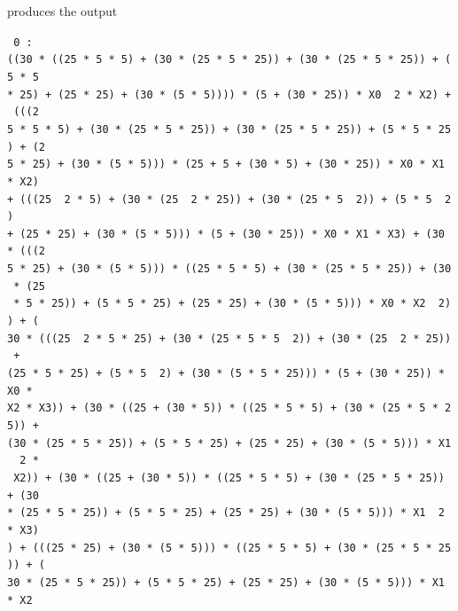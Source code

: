 
produces the output

{\tt
  0 : \\
((30\ *\ ((25\ *\ 5\ *\ 5)\ +\ (30\ *\ (25\ *\ 5\ *\ 25))\ +\ (30\ *\ (25\ *\ 5\ *\ 25))\ +\ (5\ *\ 5\ \\
*\ 25)\ +\ (25\ *\ 25)\ +\ (30\ *\ (5\ *\ 5))))\ *\ (5\ +\ (30\ *\ 25))\ *\ X0\ \ 2\ *\ X2)\ +\ (((2\\
5\ *\ 5\ *\ 5)\ +\ (30\ *\ (25\ *\ 5\ *\ 25))\ +\ (30\ *\ (25\ *\ 5\ *\ 25))\ +\ (5\ *\ 5\ *\ 25)\ +\ (2\\
5\ *\ 25)\ +\ (30\ *\ (5\ *\ 5)))\ *\ (25\ +\ 5\ +\ (30\ *\ 5)\ +\ (30\ *\ 25))\ *\ X0\ *\ X1\ *\ X2)\ \\
+\ (((25\ \ 2\ *\ 5)\ +\ (30\ *\ (25\ \ 2\ *\ 25))\ +\ (30\ *\ (25\ *\ 5\ \ 2))\ +\ (5\ *\ 5\ \ 2)\ \\
+\ (25\ *\ 25)\ +\ (30\ *\ (5\ *\ 5)))\ *\ (5\ +\ (30\ *\ 25))\ *\ X0\ *\ X1\ *\ X3)\ +\ (30\ *\ (((2\\
5\ *\ 25)\ +\ (30\ *\ (5\ *\ 5)))\ *\ ((25\ *\ 5\ *\ 5)\ +\ (30\ *\ (25\ *\ 5\ *\ 25))\ +\ (30\ *\ (25\\
\ *\ 5\ *\ 25))\ +\ (5\ *\ 5\ *\ 25)\ +\ (25\ *\ 25)\ +\ (30\ *\ (5\ *\ 5)))\ *\ X0\ *\ X2\ \ 2))\ +\ (\\
30\ *\ (((25\ \ 2\ *\ 5\ *\ 25)\ +\ (30\ *\ (25\ *\ 5\ *\ 5\ \ 2))\ +\ (30\ *\ (25\ \ 2\ *\ 25))\ +\ \\
(25\ *\ 5\ *\ 25)\ +\ (5\ *\ 5\ \ 2)\ +\ (30\ *\ (5\ *\ 5\ *\ 25)))\ *\ (5\ +\ (30\ *\ 25))\ *\ X0\ *\ \\
X2\ *\ X3))\ +\ (30\ *\ ((25\ +\ (30\ *\ 5))\ *\ ((25\ *\ 5\ *\ 5)\ +\ (30\ *\ (25\ *\ 5\ *\ 25))\ +\ \\
(30\ *\ (25\ *\ 5\ *\ 25))\ +\ (5\ *\ 5\ *\ 25)\ +\ (25\ *\ 25)\ +\ (30\ *\ (5\ *\ 5)))\ *\ X1\ \ 2\ *\\
\ X2))\ +\ (30\ *\ ((25\ +\ (30\ *\ 5))\ *\ ((25\ *\ 5\ *\ 5)\ +\ (30\ *\ (25\ *\ 5\ *\ 25))\ +\ (30\ \\
*\ (25\ *\ 5\ *\ 25))\ +\ (5\ *\ 5\ *\ 25)\ +\ (25\ *\ 25)\ +\ (30\ *\ (5\ *\ 5)))\ *\ X1\ \ 2\ *\ X3)\\
)\ +\ (((25\ *\ 25)\ +\ (30\ *\ (5\ *\ 5)))\ *\ ((25\ *\ 5\ *\ 5)\ +\ (30\ *\ (25\ *\ 5\ *\ 25))\ +\ (\\
30\ *\ (25\ *\ 5\ *\ 25))\ +\ (5\ *\ 5\ *\ 25)\ +\ (25\ *\ 25)\ +\ (30\ *\ (5\ *\ 5)))\ *\ X1\ *\ X2\ \\
}
